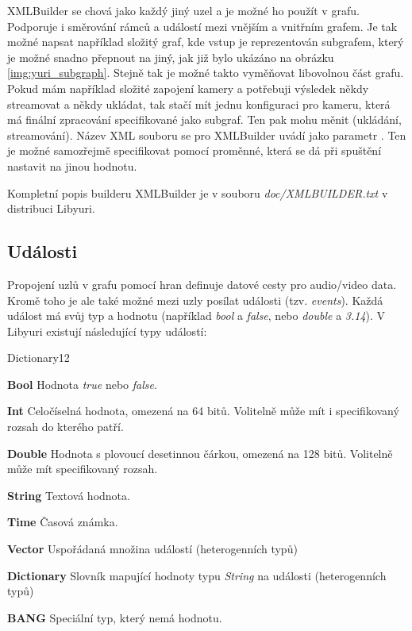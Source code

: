 \documentclass[thesis=M,czech]{FITthesis}[2012/06/26]
\begin{document}
XMLBuilder se chová jako každý jiný uzel a je možné ho použít v grafu. Podporuje i směrování rámců a událostí mezi vnějším a vnitřním grafem. Je tak možné napsat například složitý graf, kde vstup je reprezentován subgrafem, který je možné snadno přepnout na jiný, jak již bylo ukázáno na obrázku \ref{img:yuri_subgraph}. Stejně tak je možné takto vyměňovat libovolnou část grafu. Pokud mám například složité zapojení kamery a potřebuji výsledek někdy streamovat a někdy ukládat, tak stačí mít jednu konfiguraci pro kameru, která má finální zpracování specifikované jako subgraf. Ten pak mohu měnit (ukládání, streamování). 
Název XML souboru se pro XMLBuilder uvádí jako parametr . Ten je možné samozřejmě specifikovat pomocí proměnné, která se dá při spuštění nastavit na jinou hodnotu. 

Kompletní popis builderu XMLBuilder je v souboru \textit{doc/XMLBUILDER.txt} v distribuci Libyuri.

\subsection{Události} \label{subsec:analyza_yuri_udalosti}
Propojení uzlů v grafu pomocí hran definuje datové cesty pro audio/video data. Kromě toho je ale také možné mezi uzly posílat události (tzv. \textit{events}). Každá událost má svůj typ a hodnotu (například \textit{bool} a \textit{false}, nebo \textit{double} a \textit{3.14}). V Libyuri existují následující typy událostí:

\begin{labeling}{Dictionary12}
\item [\textbf{Bool}] Hodnota \textit{true} nebo \textit{false}.
\item [\textbf{Int}] Celočíselná hodnota, omezená na 64 bitů. Volitelně může mít i specifikovaný rozsah do kterého patří.
\item [\textbf{Double}] Hodnota s plovoucí desetinnou čárkou, omezená na 128 bitů. Volitelně může mít specifikovaný rozsah.
\item [\textbf{String}] Textová hodnota.
\item [\textbf{Time}] Časová známka.
\item [\textbf{Vector}] Uspořádaná množina událostí (heterogenních typů)
\item [\textbf{Dictionary}] Slovník mapující hodnoty typu \textit{String} na události (heterogenních typů)
\item [\textbf{BANG}] Speciální typ, který nemá hodnotu.
\end{labeling}
\end{document}
